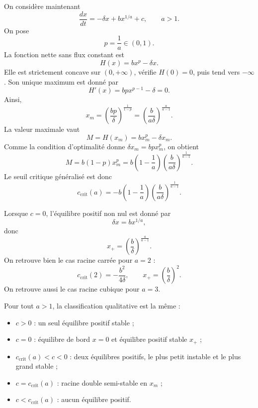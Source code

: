 \documentclass[11pt,a4paper]{article}
\begin{document}
On considère maintenant
\[
    \frac{dx}{dt}=-\delta x+b x^{1/a}+c,
    \qquad a>1.
\]
On pose
\[
    p=\frac{1}{a}\in(0,1).
\]
La fonction nette sans flux constant est
\[
    H(x)=b x^p-\delta x.
\]
Elle est strictement concave sur \((0,+\infty)\), vérifie \(H(0)=0\), puis tend vers \(-\infty\). Son unique maximum est donné par
\[
    H'(x)=bp x^{p-1}-\delta=0.
\]
Ainsi,
\begin{equation}
    x_m=
    \left(\frac{bp}{\delta}\right)^{\frac{1}{1-p}}
    =
    \left(\frac{b}{a\delta}\right)^{\frac{a}{a-1}}.
    \label{eq:power_xm}
\end{equation}
La valeur maximale vaut
\[
    M=H(x_m)=b x_m^p-\delta x_m.
\]
Comme la condition d'optimalité donne \(\delta x_m=bp x_m^p\), on obtient
\begin{equation}
    M=b(1-p)x_m^p
    =
    b\left(1-\frac1a\right)
    \left(\frac{b}{a\delta}\right)^{\frac{1}{a-1}}.
    \label{eq:power_M}
\end{equation}
Le seuil critique généralisé est donc
\begin{equation}
    c_{\mathrm{crit}}(a)
    =
    -b\left(1-\frac1a\right)
    \left(\frac{b}{a\delta}\right)^{\frac{1}{a-1}}.
    \label{eq:power_ccrit}
\end{equation}

Lorsque \(c=0\), l'équilibre positif non nul est donné par
\[
    \delta x=b x^{1/a},
\]
donc
\begin{equation}
    x_+
    =
    \left(\frac{b}{\delta}\right)^{\frac{a}{a-1}}.
    \label{eq:power_xplus_c0}
\end{equation}
On retrouve bien le cas racine carrée pour \(a=2\) :
\[
    c_{\mathrm{crit}}(2)=-\frac{b^2}{4\delta},
    \qquad
    x_+=\left(\frac{b}{\delta}\right)^2.
\]
On retrouve aussi le cas racine cubique pour \(a=3\).

Pour tout \(a>1\), la classification qualitative est la même :
\begin{itemize}
    \item \(c>0\) : un seul équilibre positif stable ;
    \item \(c=0\) : équilibre de bord \(x=0\) et équilibre positif stable \(x_+\) ;
    \item \(c_{\mathrm{crit}}(a)<c<0\) : deux équilibres positifs, le plus petit instable et le plus grand stable ;
    \item \(c=c_{\mathrm{crit}}(a)\) : racine double semi-stable en \(x_m\) ;
    \item \(c<c_{\mathrm{crit}}(a)\) : aucun équilibre positif.
\end{itemize}
\end{document}
